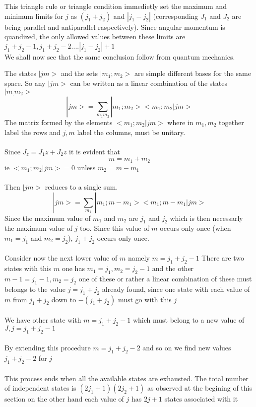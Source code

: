 This triangle rule or triangle condition immedietly set the maximum and minimum limits for $j$ as $(j_1+j_2)$ and $|j_1-j_2|$ (corresponding $J_1$ and $J_2$ are being parallel and antiparallel raspectively). Since angular momentum is quandized, the only allowed values between these limits are $j_1+j_2-1, j_1+j_2-2....|j_1-j_2|+1$\\
We shall now see that the same conclusion follow from quantum mechanics.\\
\par The states $|jm>$ and the sets $|m_1;m_2>$ are simple different bases for the same space. So any $|jm>$ can be written as a linear combination of the states $|m_;m_2>$
$$ |jm>=\sum_{m_1m_2}|m_1;m_2><m_1;m_2|jm>$$
The matrix formed by the elements $<m_1;m_2|jm>$ where in $m_1,m_2$ together label the rows and $j,m$ label the columns, must be unitary.\\\\
Since $J_z=J_1z+J_2z$ it is evident that 
$$m=m_1+m_2$$
ie $<m_1;m_2|jm>=0$ unless $m_2=m-m_1$\\\\
Then $|jm>$ reduces to a single sum.
$$ |jm>=\sum_{m_1}|m_1;m-m_1><m_1;m-m_1|jm>$$
Since the maximum value of $m_1$ and $m_2$ are $j_1$ and $j_2$ which is then necessarly the maximum value of $j$ too. Since this value of $m $  occurs only once (when $m_1=j_1$ and $m_2=j_2$), $j_1+j_2$ occurs only once.\\\\
Consider now the next lower value of $m$ namely $m=j_1+j_2-1$ There are two states with this $m$ one has $m_1=j_1,m_2=j_2-1$ and the other $m-1=j_1-1, m_2=j_2$ one of these or rather a linear combination of these must belongs to the value $j=j_1+j_2$ already found, since one state with each value of $m$ from $j_1+j_2$ down to $-(j_1+j_2)$ must go with this $j$\\\\
We have other state with $m=j_1+j_2-1$ which must belong to a new value of $J,j=j_1+j_2-1$\\\\
By extending this procedure $m=j_1+j_2-2$ and so on we find new values $j_1+j_2-2$ for $j$\\\\
This process ends when all the available states are exhausted. The total number of independent states is $(2j_1+1)(2j_2+1)$ as observed at the begining of this section on the other hand each value of $j$ has $2j+1$ states associated with it\\\\
